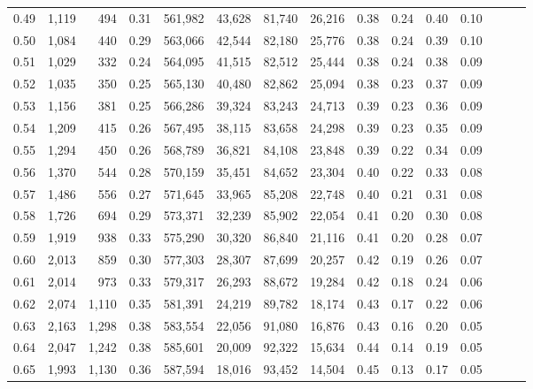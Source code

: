 \begin{tabular}{rrrrrrrrrrrrrrr}
0.49 &   1,119 &    494 &  0.31 &  561,982 &   43,628 &   81,740 &   26,216 &  0.38 &  0.24 &  0.40 &      0.10 \\
0.50 &   1,084 &    440 &  0.29 &  563,066 &   42,544 &   82,180 &   25,776 &  0.38 &  0.24 &  0.39 &      0.10 \\
0.51 &   1,029 &    332 &  0.24 &  564,095 &   41,515 &   82,512 &   25,444 &  0.38 &  0.24 &  0.38 &      0.09 \\
0.52 &   1,035 &    350 &  0.25 &  565,130 &   40,480 &   82,862 &   25,094 &  0.38 &  0.23 &  0.37 &      0.09 \\
0.53 &   1,156 &    381 &  0.25 &  566,286 &   39,324 &   83,243 &   24,713 &  0.39 &  0.23 &  0.36 &      0.09 \\
0.54 &   1,209 &    415 &  0.26 &  567,495 &   38,115 &   83,658 &   24,298 &  0.39 &  0.23 &  0.35 &      0.09 \\
0.55 &   1,294 &    450 &  0.26 &  568,789 &   36,821 &   84,108 &   23,848 &  0.39 &  0.22 &  0.34 &      0.09 \\
0.56 &   1,370 &    544 &  0.28 &  570,159 &   35,451 &   84,652 &   23,304 &  0.40 &  0.22 &  0.33 &      0.08 \\
0.57 &   1,486 &    556 &  0.27 &  571,645 &   33,965 &   85,208 &   22,748 &  0.40 &  0.21 &  0.31 &      0.08 \\
0.58 &   1,726 &    694 &  0.29 &  573,371 &   32,239 &   85,902 &   22,054 &  0.41 &  0.20 &  0.30 &      0.08 \\
0.59 &   1,919 &    938 &  0.33 &  575,290 &   30,320 &   86,840 &   21,116 &  0.41 &  0.20 &  0.28 &      0.07 \\
0.60 &   2,013 &    859 &  0.30 &  577,303 &   28,307 &   87,699 &   20,257 &  0.42 &  0.19 &  0.26 &      0.07 \\
0.61 &   2,014 &    973 &  0.33 &  579,317 &   26,293 &   88,672 &   19,284 &  0.42 &  0.18 &  0.24 &      0.06 \\
0.62 &   2,074 &  1,110 &  0.35 &  581,391 &   24,219 &   89,782 &   18,174 &  0.43 &  0.17 &  0.22 &      0.06 \\
0.63 &   2,163 &  1,298 &  0.38 &  583,554 &   22,056 &   91,080 &   16,876 &  0.43 &  0.16 &  0.20 &      0.05 \\
0.64 &   2,047 &  1,242 &  0.38 &  585,601 &   20,009 &   92,322 &   15,634 &  0.44 &  0.14 &  0.19 &      0.05 \\
0.65 &   1,993 &  1,130 &  0.36 &  587,594 &   18,016 &   93,452 &   14,504 &  0.45 &  0.13 &  0.17 &      0.05 \\

\end{tabular}
